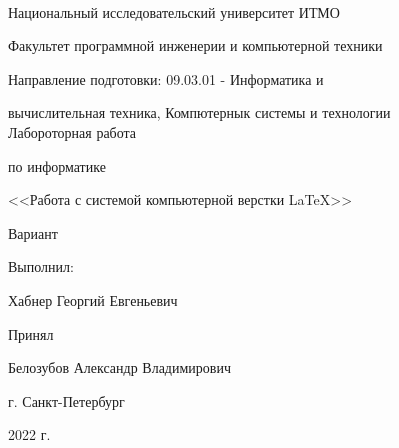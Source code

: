 

\hfill \\
\begin{center}
Национальный исследовательский университет ИТМО \par Факультет программной инженерии и компьютерной техники \par Направление подготовки: 09.03.01 - Информатика и \par
вычислительная техника, Компютернык системы и технологии \\ \vspace{7cm}  Лабороторная работа  \par 
по информатике \par
<<Работа с системой компьютерной верстки \LaTeX>> \par
Вариант  
\end{center}
\vspace{4cm}
\begin{flushright}
Выполнил: \par
Хабнер Георгий Евгеньевич \par Принял \par 
Белозубов Александр Владимирович \\
\end{flushright}
\vspace{8cm}
\begin{center}
 г. Санкт-Петербург \par 2022 г.
\end{center}


